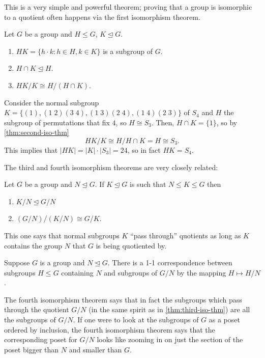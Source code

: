 \documentclass[11pt]{scrartcl}
\providecommand{\normaleq}{\trianglelefteq}
\providecommand{\ii}{\item}
\providecommand{\abs}[1]{\left|#1\right|}
\begin{document}
This is a very simple and powerful theorem;
proving that a group is isomorphic to a quotient
often happens via the first isomorphism theorem.

\begin{theorem}
    \label{thm:second-iso-thm}
    Let $G$ be a group and $H\le G$, $K\normaleq G$.
    \begin{enumerate}[(1)]
	\ii $HK = \{h\cdot k : h\in H, k\in K\}$ is a subgroup of $G$.
	\ii $H\cap K\normaleq H$.
	\ii $HK/K\cong H/(H\cap K)$.
    \end{enumerate}
\end{theorem}

\begin{example}
    Consider the normal subgroup $K = \{(1), (1\;2)(3\;4), (1\;3)(2\;4), (1\;4)(2\;3)\}$
    of $S_4$ and $H$ the subgroup of permutations that fix $4$, so $H\cong S_3$.
    Then, $H\cap K = \{1\}$, so by \autoref{thm:second-iso-thm}
    \begin{equation*}
        HK/K \cong H/H\cap K = H \cong S_3.
    \end{equation*}
    This implies that $\abs{HK} = \abs K\cdot \abs{S_3} = 24$,
    so in fact $HK = S_4$.
\end{example}

The third and fourth isomorphism theorems are very closely related:
\begin{theorem}
    \label{thm:third-iso-thm}
    Let $G$ be a group and $N\normaleq G$. If $K\normaleq G$ is
    such that $N\le K\le G$ then
    \begin{enumerate}[(1)]
        \ii $K/N\normaleq G/N$
	\ii $(G/N)/(K/N)\cong G/K$.
    \end{enumerate}
\end{theorem}

This one says that normal subgroups $K$ ``pass through'' quotients
as long as $K$ contains the group $N$ that $G$ is being quotiented by.

\begin{theorem}
    \label{thm:fourth-iso-thm}
    Suppose $G$ is a group and $N\normaleq G$.
    There is a 1-1 correspondence between subgroups $H\le G$ containing $N$
    and subgroups of $G/N$ by the mapping $H\mapsto H/N$.
\end{theorem}

The fourth isomorphism theorem says that in fact the subgroups
which pass through the quotient $G/N$
(in the same spirit as in \autoref{thm:third-iso-thm})
are all the subgroups of $G/N$.
If one were to look at the subgroups of $G$ as a poset
ordered by inclusion, the fourth isomorphism theorem says that
the corresponding poset for $G/N$ looks like zooming in on
just the section of the poset bigger than $N$ and smaller than $G$.
\end{document}
